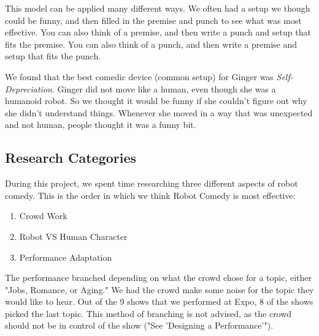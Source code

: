 This model can be applied many different ways.
We often had a setup we though could be funny, and then filled in the premise and punch to see what was most effective.
You can also think of a premise, and then write a punch and setup that fits the premise.
You can also think of a punch, and then write a premise and setup that fits the punch.

We found that the best comedic device (common setup) for Ginger was \textit{Self-Depreciation}.
Ginger did not move like a human, even though she was a humanoid robot.
So we thought it would be funny if she couldn't figure out why she didn't understand things.
Whenever she moved in a way that was unexpected and not human, people thought it was a funny bit.

\subsection{Research Categories}

    During this project, we spent time researching three different aspects of robot comedy.
    This is the order in which we think Robot Comedy is most effective:

		\begin{enumerate}
			\item{Crowd Work}
			\item{Robot VS Human Character}
			\item{Performance Adaptation}
		\end{enumerate}

        The performance branched depending on what the crowd chose for a topic, either "Jobs, Romance, or Aging."
        We had the crowd make some noise for the topic they would like to hear.
        Out of the 9 shows that we performed at Expo, 8 of the shows picked the last topic.
        This method of branching is not advised, as the crowd should not be in control of the show ("See 'Designing a Performance'").

